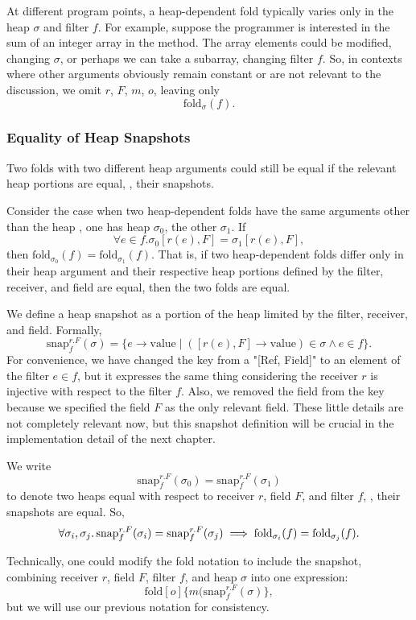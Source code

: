 \documentclass[msc,oneside]{ubcthesis}
\theoremstyle{definition}
\begin{document}
At different program points, a heap-dependent fold typically varies only in the heap $\sigma$ and filter $f$. For example, suppose the programmer is interested in the sum of an integer array in the method. The array elements could be modified, changing $\sigma$, or perhaps we can take a subarray, changing filter $f$. So, in contexts where other arguments obviously remain constant or are not relevant to the discussion, we omit $r$, $F$, $m$, $o$, leaving only
$$\textrm{fold}_{\sigma}(f).$$

\subsubsection{Equality of Heap Snapshots}
Two folds with two different heap arguments could still be equal if the relevant heap portions are equal, \ie, their snapshots. 

Consider the case when two heap-dependent folds have the same arguments other than the heap \ie, one has heap $\sigma_0$, the other $\sigma_1$. If $$\forall e \in f. \sigma_0[r(e), F] = \sigma_1[r(e), F],$$ then
$\textrm{fold}_{\sigma_0}(f) = \textrm{fold}_{\sigma_1}(f)$. That is, if two heap-dependent folds differ only in their heap argument and their respective heap portions defined by the filter, receiver, and field are equal, then the two folds are equal. 

We define a heap snapshot as a portion of the heap limited by the filter, receiver, and field. Formally,
$$\textrm{snap}^{r.F}_{f}(\sigma) = \{ e \rightarrow \textrm{value} \mid ([r(e), F] \rightarrow \textrm{value}) \in \sigma \land e \in f\}.$$ For convenience, we have changed the key from a "[Ref, Field]" to an element of the filter $e \in f$, but it expresses the same thing considering the receiver $r$ is injective with respect to the filter $f$. Also, we removed the field from the key because we specified the field $F$ as the only relevant field. These little details are not completely relevant now, but this snapshot definition will be crucial in the implementation detail of the next chapter.

We write
$$\textrm{snap}^{r.F}_{f}(\sigma_0) = \textrm{snap}^{r.F}_{f}(\sigma_1)$$ to denote two heaps equal with respect to receiver $r$, field $F$, and filter $f$, \ie, their snapshots are equal. So, $$\forall \sigma_i, \sigma_j \ldotp \textrm{snap}^{r.F}_{f}(\sigma_i) = \textrm{snap}^{r.F}_{f}(\sigma_j) \implies \textrm{fold}_{\sigma_i}(f) = \textrm{fold}_{\sigma_j}(f).$$ 

Technically, one could modify the fold notation to include the snapshot, combining receiver $r$, field $F$, filter $f$, and heap $\sigma$ into one expression: $$\textrm{fold}[o]\{m(\textrm{snap}^{r.F}_{f}(\sigma)\},$$ but we will use our previous notation for consistency.
\end{document}
